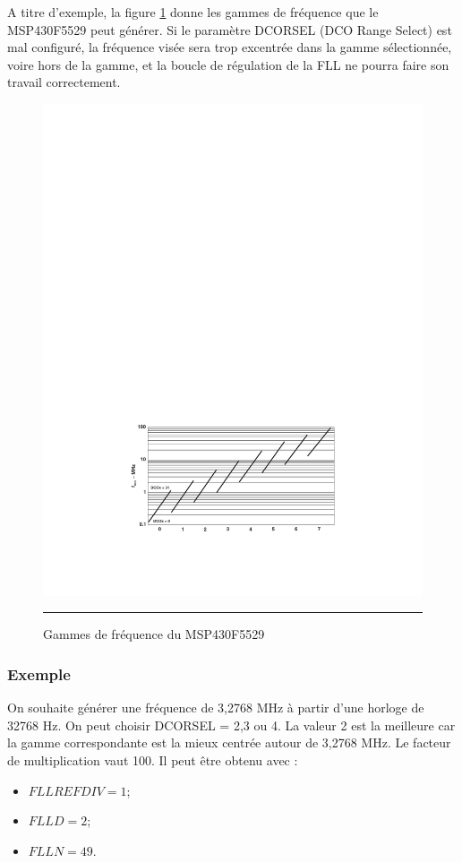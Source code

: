 A titre d'exemple, la figure \ref{fig:FLL_Gammes} donne les gammes de fréquence que le MSP430F5529 peut générer. Si le paramètre DCORSEL (DCO Range Select) est mal configuré, la fréquence visée sera trop excentrée dans la gamme sélectionnée, voire hors de la gamme, et la boucle de régulation de la FLL ne pourra faire son travail correctement.

\begin{figure}[!htb]
  \centering
  \includegraphics [angle=0, width=14cm]{./Figures/Chap6_Horloges/FLL_Gammes.pdf}
  \rule{35em}{0.5pt}
  \caption{Gammes de fréquence du MSP430F5529}
  \label{fig:FLL_Gammes}
\end{figure}



\subsubsection*{Exemple}
On souhaite générer une fréquence de 3,2768 MHz à partir d'une horloge de 32768 Hz. On peut choisir DCORSEL = 2,3 ou 4. La valeur 2 est la meilleure car la gamme correspondante est la mieux centrée autour de 3,2768 MHz.
Le facteur de multiplication vaut 100. Il peut être obtenu avec :
\begin{itemize}[label=\textbullet,font=\small]
\item $FLLREFDIV = 1$;
\item $FLLD = 2$;
\item $FLLN = 49$.
\end{itemize}



